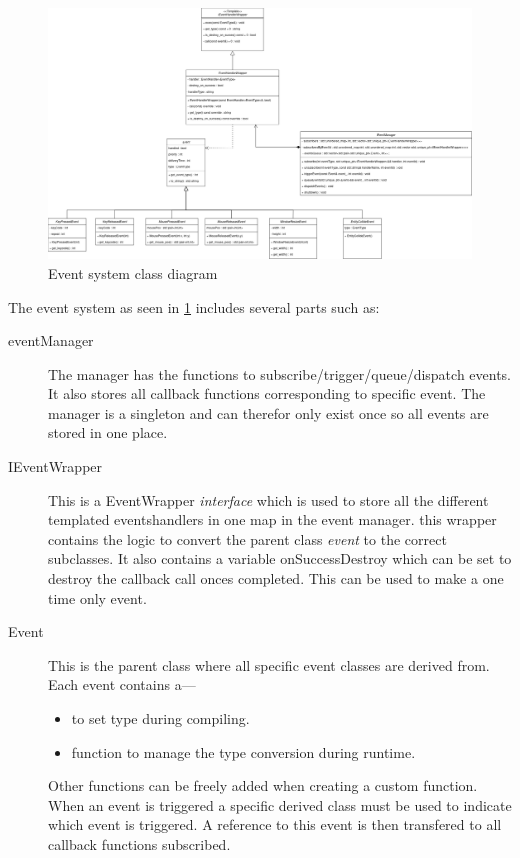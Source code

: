 \documentclass{projdoc}
\begin{document}
\begin{figure}
	\centering
	\includegraphics[width=\linewidth]{img/event-uml.drawio.png}
	\caption{Event system class diagram}
	\label{fig:event-uml}
\end{figure}

The event system as seen in \cref{fig:event-uml} includes several parts such
as:\noparbreak
\begin{description}
	\item[eventManager] The manager has the functions to
		subscribe/trigger/queue/dispatch events. It also stores all callback functions
		corresponding to specific event. The manager is a singleton and can therefor only
		exist once so all events are stored in one place.
	\item[IEventWrapper] This is a EventWrapper \emph{interface} which is used to store
		all the different templated eventshandlers in one map in the event manager. this
		wrapper contains the logic to convert the parent class \emph{event} to the
		correct subclasses. It also contains a variable onSuccessDestroy which can be set
		to destroy the callback call onces completed. This can be used to make a one time
		only event.
	\item[Event] This is the parent class where all specific event classes are derived
		from. Each event contains a---
		\begin{itemize}
			\item \emph{} to set type
				during compiling.
			\item \emph{}
				function to manage the type conversion during runtime.
		\end{itemize}
		Other functions can be freely added when creating a custom function. When an
		event is triggered a specific derived class must be used to indicate which event
		is triggered. A reference to this event is then transfered to all callback
		functions subscribed.
\end{description}
\end{document}
